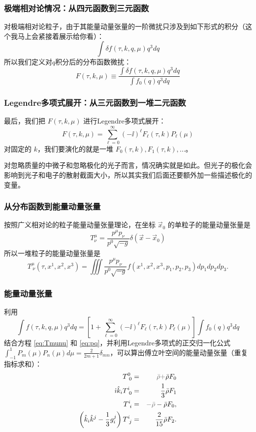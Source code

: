 \documentclass[CJK,13pt]{beamer}
\begin{document}
  \begin{frame}
    \frametitle{极端相对论情况：从四元函数到三元函数}
    对极端相对论粒子，由于其能量动量张量的一阶微扰只涉及到如下形式的积分（这个我马上会紧接着展示给你看）：
    $$\int \delta f (\tau, k, q, \mu) q^3 dq $$
    所以我们定义{\blue 对$q$积分后的分布函数微扰}：
    $$ F(\tau, k, \mu) \equiv \frac{\int \delta f (\tau, k, q, \mu) q^3 dq}{\int f_0(q) q^3 dq} $$
  \end{frame}


    \begin{frame}
      \frametitle{Legendre多项式展开：从三元函数到一堆二元函数}
      最后，我们把 $F(\tau, k, \mu)$ 进行Legendre多项式展开：
      $$ F(\tau, k, \mu) = \sum_{\ell=0}^\infty (-\ii)^\ell F_\ell(\tau, k) P_\ell(\mu) $$
      对固定的 $k$，我们要演化的就是一堆 $F_0(\tau, k), F_1(\tau, k),\ldots$。

      \skipline
      
      对忽略质量的中微子和忽略极化的光子而言，情况确实就是如此。但光子的极化会影响到光子和电子的散射截面大小，所以其实我们后面还要额外加一些描述极化的变量。
    \end{frame}

    \begin{frame}
      \frametitle{从分布函数到能量动量张量}
      按照广义相对论的粒子能量动量张量理论，在坐标 $\vec{x}_0$ 的单粒子的能量动量张量是
      $$ T^\mu_\nu = \frac{p^\mu p_\nu}{p^0\sqrt{-g}}\delta(\vec{x}-\vec{x}_0) $$
      所以一堆粒子的能量动量张量是
      \begin{equation}
        T^\mu_{\ \nu}(\tau, x^1, x^2, x^3) = \iiint \frac{p^\mu p_\nu}{p^0\sqrt{-g}}f(x^1, x^2, x^3, p_1, p_2, p_3) dp_1 dp_2dp_3. \label{eq:Tmunu}
      \end{equation}
  \end{frame}


    
    \begin{frame}
      \frametitle{能量动量张量}
      利用
      $$ \int f(\tau, k, q, \mu) q^3 dq =   \left[1+\sum_{\ell=0}^\infty(-\ii)^\ell F_\ell(\tau, k)P_\ell(\mu)\right] \int f_0(q) q^3 dq $$
      结合方程 \eqref{eq:Tmunu} 和 \eqref{eq:pq}，并利用Legendre多项式的正交归一化公式 $\int_{-1}^1P_m(\mu)P_n(\mu) d\mu = \frac{2}{2m+1}\delta_{mn}$，可以算出傅立叶空间的能量动量张量（重复指标求和）：
     {\blue \begin{eqnarray}
      T^0_{\ 0} &=& {\gray \bar{\rho}+}\bar{\rho} F_0 \label{eq:f1}\\
      \ii \hat{k}_i T^i_{\ 0} &=& \frac{1}{3}\bar{\rho} F_1 \\
      T^i_{\ i} &=& {\gray -\bar{\rho}} - \bar{\rho} F_0,  \\
     \left(\hat{k}_i\hat{k}^j-\frac{1}{3}g_i^j\right)T^i_{\ j} &=& \frac{2}{15}\bar{\rho}F_2. \label{eq:f4}
      \end{eqnarray}}
    \end{frame}
    
\end{document}
